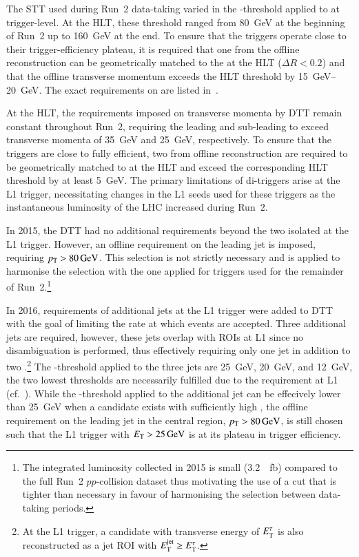 The STT used during Run~2 data-taking varied in the \pT-threshold
applied to \tauhadvis at trigger-level. At the HLT, these threshold
ranged from \SI{80}{\GeV} at the beginning of Run~2 up to
\SI{160}{\GeV} at the end. To ensure that the triggers operate close
to their trigger-efficiency plateau, it is required that one
\tauhadvis from the offline reconstruction can be geometrically
matched to the \tauhadvis at the HLT ($\Delta R < 0.2$) and that the
offline \tauhadvis transverse momentum exceeds the HLT threshold by
\SIrange{15}{20}{\GeV}. The exact requirements on \tauhadvis are
listed in~.

At the HLT, the requirements imposed on \tauhadvis transverse momenta
by DTT remain constant throughout Run~2, requiring the leading and
sub-leading \tauhadvis to exceed transverse momenta of \SI{35}{\GeV}
and \SI{25}{\GeV}, respectively. To ensure that the triggers are close
to fully efficient, two \tauhadvis from offline reconstruction are
required to be geometrically matched to \tauhadvis at the HLT and
exceed the corresponding HLT threshold by at least \SI{5}{\GeV}. The
primary limitations of di-\tauhadvis triggers arise at the L1 trigger,
necessitating changes in the L1 seeds used for these triggers as the
instantaneous luminosity of the LHC increased during Run~2.

In 2015, the DTT had no additional requirements beyond the two
isolated \tauhadvis at the L1 trigger. However, an offline requirement
on the leading jet \pT is imposed, requiring $\pT >
\SI{80}{\GeV}$. This selection is not strictly necessary and is
applied to harmonise the selection with the one applied for triggers
used for the remainder of Run~2.\footnote{The integrated luminosity
  collected in 2015 is small (\SI{3.2}{\per\femto\barn}) compared to
  the full Run~2 $pp$-collision dataset thus motivating the use of a
  cut that is tighter than necessary in favour of harmonising the
  selection between data-taking periods.}

In 2016, requirements of additional jets at the L1 trigger were added
to DTT with the goal of limiting the rate at which events are
accepted. Three additional jets are required, however, these jets
overlap with \tauhadvis ROIs at L1 since no disambiguation is
performed, thus effectively requiring only one jet in addition to two
\tauhadvis.\footnote{At the L1 trigger, a \tauhadvis candidate with
  transverse energy of $E_{\text{T}}^\tau$ is also reconstructed as a jet ROI
  with $E_{\text{T}}^{\text{jet}} \geq E_{\text{T}}^\tau$.}  The \ET-threshold applied
to the three jets are \SI{25}{\GeV}, \SI{20}{\GeV}, and \SI{12}{\GeV},
the two lowest thresholds are necessarily fulfilled due to the
\tauhadvis requirement at L1 (cf.\ ). While
the \ET-threshold applied to the additional jet can be effecively
lower than \SI{25}{\GeV} when a \tauhadvis candidate exists with
sufficiently high \ET, the offline requirement on the leading jet in
the central region, $\pT > \SI{80}{\GeV}$, is still chosen such that
the L1 trigger with $E_{\text{T}} > \SI{25}{\ensuremath{\text{GeV}}}$ is at its plateau in trigger
efficiency.

